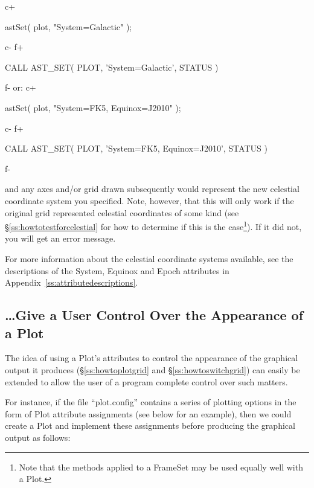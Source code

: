 \documentclass[twoside,11pt]{starlink}
\providecommand{\appref}[1]{Appendix~\ref{#1}}
\providecommand{\secref}[1]{\S\ref{#1}}
\begin{document}
c+
\small
\begin{terminalv}
astSet( plot, "System=Galactic" );
\end{terminalv}
\normalsize
c-
f+
\small
\begin{terminalv}
      CALL AST_SET( PLOT, 'System=Galactic', STATUS )
\end{terminalv}
\normalsize
f-
or:
c+
\small
\begin{terminalv}
astSet( plot, "System=FK5, Equinox=J2010" );
\end{terminalv}
\normalsize
c-
f+
\small
\begin{terminalv}
      CALL AST_SET( PLOT, 'System=FK5, Equinox=J2010', STATUS )
\end{terminalv}
\normalsize
f-

and any axes and/or grid drawn subsequently would represent the new
celestial coordinate system you specified.  Note, however, that this
will only work if the original grid represented celestial coordinates
of some kind (see \secref{ss:howtotestforcelestial} for how to
determine if this is the case\footnote{Note that the methods applied
to a FrameSet may be used equally well with a Plot.}). If it did not,
you will get an error message.

For more information about the celestial coordinate systems available,
see the descriptions of the System, Equinox and Epoch attributes in
\appref{ss:attributedescriptions}.

\subsection{\ldots Give a User Control Over the Appearance of a Plot}

The idea of using a Plot's attributes to control the appearance of the
graphical output it produces (\secref{ss:howtoplotgrid} and
\secref{ss:howtoswitchgrid}) can easily be extended to allow the user
of a program complete control over such matters.

For instance, if the file ``plot.config'' contains a series of
plotting options in the form of Plot attribute assignments (see below
for an example), then we could create a Plot and implement these
assignments before producing the graphical output as follows:
\end{document}
